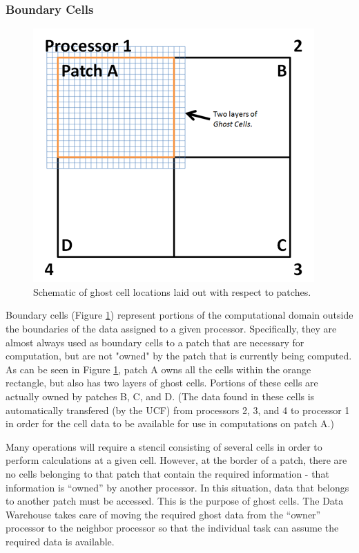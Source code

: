 \documentclass[12pt]{report}
\begin{document}
\subsubsection{Boundary Cells}

\begin{figure}
  \includegraphics{GhostCells.png}
  \caption{Schematic of ghost cell locations laid out with respect to patches.}
  \label{Fig:GhostCells}
\end{figure}

Boundary cells (Figure \ref{Fig:GhostCells}) represent portions of the computational domain outside the boundaries of the data assigned to a given processor. Specifically, they are almost always used as boundary cells to a patch that are necessary for computation, but are not "owned" by the patch that is currently being computed. As can be seen in Figure \ref{Fig:GhostCells}, patch A owns all the cells within the orange rectangle, but also has two layers of ghost cells. Portions of these cells are actually owned by patches B, C, and D. (The data found in these cells is automatically transfered (by the UCF) from processors 2, 3, and 4 to processor 1 in order for the cell data to be available for use in computations on patch A.)

Many operations will require a stencil consisting of several cells in order to perform calculations at a given cell. However, at the border of a patch, there are no cells belonging to that patch that contain the required information - that information is ``owned'' by another processor.  In this situation, data that belongs to another patch must be accessed. This is the purpose of ghost cells. The Data Warehouse takes care of moving the required ghost data from the ``owner'' processor to the neighbor processor so that the individual task can assume the required data is available. 
\end{document}
